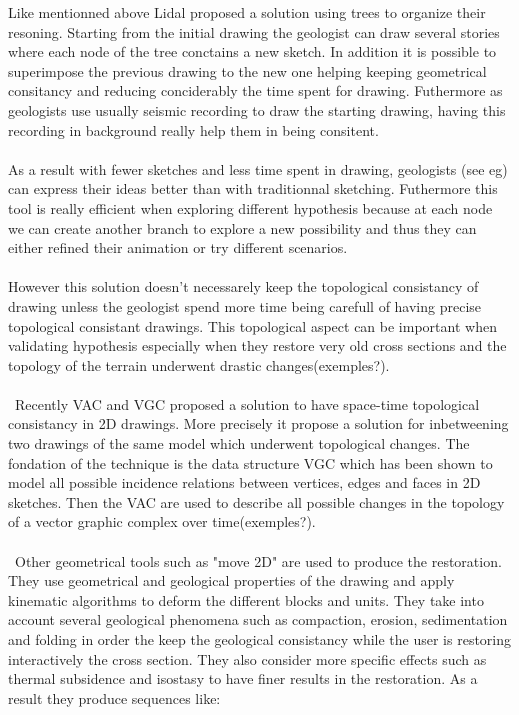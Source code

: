 \documentclass[12pt, a4paper]{memoir} %
\begin{document}
Like mentionned above Lidal \cite{lidal} proposed a solution using trees to organize their resoning. Starting from the initial drawing the geologist can draw several stories where each node of the tree conctains a new sketch. In addition it is possible to superimpose the previous drawing to the new one helping keeping geometrical consitancy and reducing conciderably the time spent for drawing. Futhermore as geologists use usually seismic recording to draw the starting drawing, having this recording in background really help them in being consitent.\\\\
 As a result with fewer sketches and less time spent in drawing, geologists (see eg) can express their ideas better than with traditionnal sketching. Futhermore this tool is really efficient when exploring different hypothesis  because at each node we can create another branch to explore a new possibility and thus they can either refined their animation or try different scenarios. \\\\
However this solution doesn't necessarely keep the topological consistancy of drawing unless the geologist spend more time being carefull of having precise topological consistant drawings. This topological aspect can be important when validating hypothesis especially when they restore very old cross sections and the topology of the terrain underwent drastic changes(exemples?).\\\\\
Recently VAC \cite{vac} and VGC \cite{vgc} proposed a solution to have space-time topological consistancy in 2D drawings. More precisely it propose a solution for inbetweening two drawings of the same model which underwent topological changes. The fondation of the technique is the data structure VGC which has been shown to model all possible incidence relations between vertices, edges and faces in 2D sketches. Then the VAC are used to describe all possible changes in the topology of a vector graphic complex over time(exemples?).\\\\\
Other geometrical tools such as "move 2D" \cite{Move} are used  to produce the restoration. They use geometrical and geological properties of the drawing and apply kinematic algorithms to deform the different blocks and units. They take into account several geological phenomena such as compaction, erosion, sedimentation and folding in order the keep the geological consistancy while the user is restoring interactively the cross section. They also consider more specific effects such as thermal subsidence and isostasy to have finer results in the restoration. As a result they produce sequences like:
\end{document}
